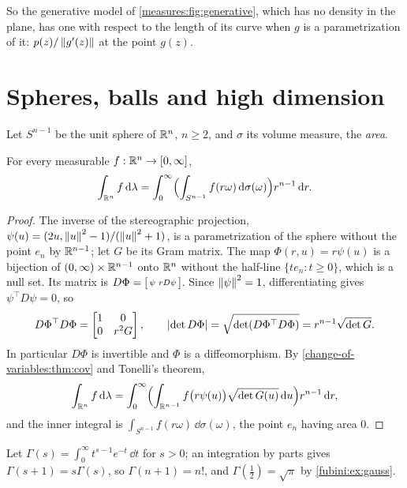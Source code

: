 \begin{notechapter}
So the generative model of \cref{measures:fig:generative}, which has no
density in the plane, has one with respect to the length of its curve
when $g$ is a parametrization of it: $p(z)/\left\|g'(z)\right\|$ at the point
$g(z)$.

\section{Spheres, balls and high dimension}
\label{change-of-variables:sec:spheres}

Let $S^{n-1}$ be the unit sphere of $\mathbb{R}^n$, $n\geq2$, and $\sigma$ its
volume measure, the \emph{area}.

\begin{theorem}
\label{change-of-variables:thm:polar}
For every measurable $f:\mathbb{R}^n\to[0, \infty]$,
\[
  \int_{\mathbb{R}^n}f\,\mathrm{d}\lambda
  = \int_0^\infty\Bigl(\int_{S^{n-1}}f(r\omega)\,\mathrm{d}\sigma(\omega)\Bigr)
    r^{n-1}\,\mathrm{d} r .
\]
\end{theorem}

\begin{proof}
The inverse of the stereographic projection,
$\psi(u) = (2u, \left\|u\right\|^2 - 1)/(\left\|u\right\|^2 + 1)$, is a parametrization of
the sphere without the point $e_n$ by $\mathbb{R}^{n-1}$; let $G$ be its Gram
matrix. The map $\Phi(r, u) = r\psi(u)$ is a bijection of
$(0, \infty)\times\mathbb{R}^{n-1}$ onto $\mathbb{R}^n$ without the half-line
$\{te_n : t\geq0\}$, which is a null set. Its matrix is
$D\Phi = \begin{bsmallmatrix}\psi & rD\psi\end{bsmallmatrix}$. Since
$\left\|\psi\right\|^2 = 1$, differentiating gives $\psi^\top D\psi = 0$, so
\[
  D\Phi^\top D\Phi
  = \begin{bmatrix}1 & 0\\ 0 & r^2G\end{bmatrix} , \qquad
  \left|\det D\Phi\right| = \sqrt{\det(D\Phi^\top D\Phi)}
  = r^{n-1}\sqrt{\det G} .
\]
In particular $D\Phi$ is invertible and $\Phi$ is a diffeomorphism. By
\cref{change-of-variables:thm:cov} and Tonelli's theorem,
\[
  \int_{\mathbb{R}^n}f\,\mathrm{d}\lambda
  = \int_0^\infty\Bigl(\int_{\mathbb{R}^{n-1}}f\bigl(r\psi(u)\bigr)
    \sqrt{\det G(u)}\,\mathrm{d} u\Bigr)r^{n-1}\,\mathrm{d} r ,
\]
and the inner integral is $\int_{S^{n-1}}f(r\omega)\,\dd\sigma(\omega)$,
the point $e_n$ having area $0$.
\end{proof}

Let $\Gamma(s) = \int_0^\infty t^{s-1}e^{-t}\,\dd t$ for $s > 0$; an
integration by parts gives $\Gamma(s + 1) = s\Gamma(s)$, so
$\Gamma(n + 1) = n!$, and $\Gamma(\frac12) = \sqrt\pi$ by
\cref{fubini:ex:gauss}.


\end{notechapter}
